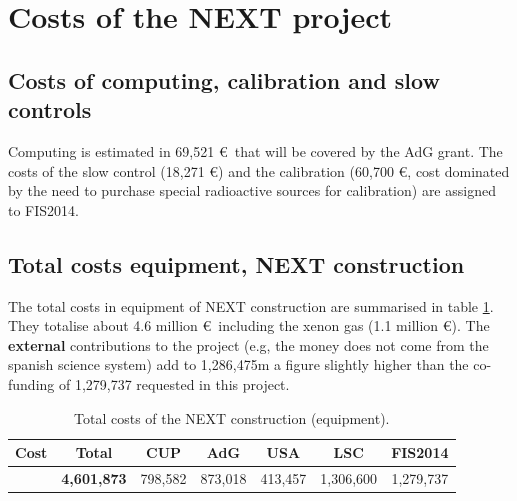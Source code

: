 \documentclass[a4paper,11pt,oneside]{article}
\begin{document}
\section{\bf Costs of the NEXT project}
\label{next.costs}





\subsection{Costs of computing, calibration and slow controls}
Computing is estimated in 69,521 \euro\ that will be covered by the AdG grant. The costs of the slow control (18,271 \euro) and the calibration (60,700 \euro, cost dominated by the need to purchase special radioactive sources for calibration) are assigned to FIS2014. 

\subsection{Total costs equipment, NEXT construction}
The total costs in equipment of NEXT construction are summarised in table  \ref{tab.TotalE}. They totalise about 4.6 million \euro\ including the xenon gas (1.1 million \euro). The {\bf external} contributions to the project (e.g, the money does not come from the spanish science system)
add to 1,286,475m a figure slightly higher than the co-funding of 1,279,737
requested in this project. 

\begin{table}[h!]
\begin{center}
\begin{tabular}{|l|c|c|c|c|c|c|}
\hline
Cost	& Total &	CUP &	AdG	& USA &	LSC &	FIS2014 \\
 \hline
& {\bf 4,601,873} &	798,582 & 	873,018 & 	413,457&	1,306,600 & 1,279,737 \\	
 \hline\hline
\end{tabular}  
\caption{Total costs of the NEXT construction (equipment).}
\label{tab.TotalE}
\end{center}
\end{table} 



\end{document}

